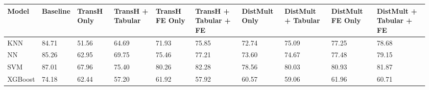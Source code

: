 \begin{tabular}{llllllllll}
\toprule
Model & Baseline & TransH Only & TransH + Tabular & TransH FE Only & TransH + Tabular + FE & DistMult Only & DistMult + Tabular & DistMult FE Only & DistMult + Tabular + FE \\
\midrule
KNN & 84.71 & 51.56 & 64.69 & 71.93 & 75.85 & 72.74 & 75.09 & 77.25 & 78.68 \\
NN & 85.26 & 62.95 & 69.75 & 75.46 & 77.21 & 73.60 & 74.67 & 77.48 & 79.15 \\
SVM & 87.01 & 67.96 & 75.40 & 80.26 & 82.28 & 78.56 & 80.03 & 80.93 & 81.87 \\
XGBoost & 74.18 & 62.44 & 57.20 & 61.92 & 57.92 & 60.57 & 59.06 & 61.96 & 60.71 \\
\bottomrule
\end{tabular}
